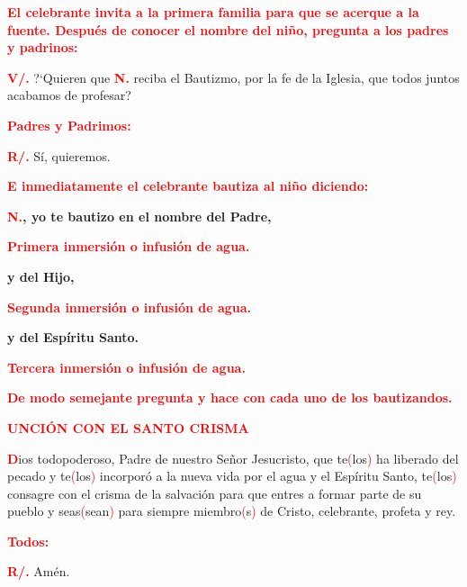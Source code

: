 \documentclass[12pt, letterpaper]{report}
\begin{document}
\large {\bfseries \textcolor{red}{El celebrante invita a la primera familia para que se acerque a la fuente. Despu\'es de conocer el nombre del ni\~no, pregunta a los padres y padrinos:}} 

\noindent
\Large {\bfseries \textcolor{red}{V/.}} \hspace{0.5cm} \Large {?`Quieren que {\bfseries \textcolor{red}{N.}} reciba el Bautizmo, por la fe de la Iglesia, que todos juntos acabamos de profesar?}

\large {\bfseries \textcolor{red}{Padres y Padrimos:}}

\noindent
\Large {\bfseries \textcolor{red}{R/.}} \hspace{0.5cm} S\'i, quieremos. 

\large {\bfseries \textcolor{red}{E inmediatamente el celebrante bautiza al ni\~no diciendo:}}

\LARGE{ \bfseries \textcolor{red}{N.}, yo te bautizo en el nombre del Padre,}

\large {\bfseries \textcolor{red}{Primera inmersi\'on o infusi\'on de agua.}}

\LARGE {\bfseries y del Hijo,}

\large {\bfseries \textcolor{red}{Segunda inmersi\'on o infusi\'on de agua.}}

\LARGE {\bfseries y del Esp\'iritu Santo.}

\large {\bfseries \textcolor{red}{Tercera inmersi\'on o infusi\'on de agua.}}

\large {\bfseries \textcolor{red}{De modo semejante pregunta y hace con cada uno de los bautizandos.}}

\Large {\bfseries \textcolor{red}{UNCI\'ON CON EL SANTO CRISMA}} 

\lettrine[lines=1]{\bfseries \textcolor{red}{D}}{}\Large ios todopoderoso, Padre de nuestro Se\~nor Jesucristo, que te\textcolor{red}{(}los\textcolor{red}{)} ha liberado del pecado y te\textcolor{red}{(}los\textcolor{red}{)} incorpor\'o a la nueva vida por el agua y el Esp\'iritu Santo, te\textcolor{red}{(}los\textcolor{red}{)} consagre con el crisma de la salvaci\'on para que entres a formar parte de su pueblo y seas\textcolor{red}{(}sean\textcolor{red}{)} para siempre miembro\textcolor{red}{(}s\textcolor{red}{)} de Cristo, celebrante, profeta y rey. 

\large {\bfseries \textcolor{red}{Todos:}} 

\noindent
\Large {\bfseries \textcolor{red}{R/.}} \hspace{0.5cm} Am\'en. 
\end{document}
